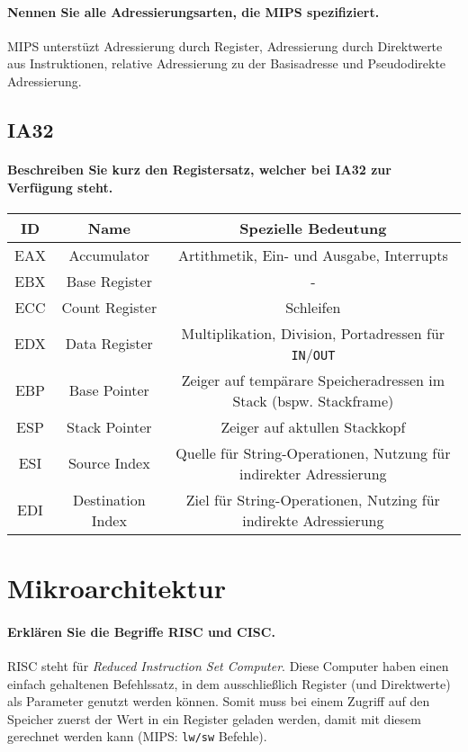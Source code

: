 \documentclass[a4paper, 11pt, accentcolor = tud3b]{tudreport}
\begin{document}
                \paragraph{Nennen Sie alle Adressierungsarten, die MIPS spezifiziert.}
                    MIPS unterstüzt Adressierung durch Register, Adressierung durch Direktwerte aus Instruktionen, relative Adressierung zu der Basisadresse und Pseudodirekte Adressierung.

            \subsection{IA32}
                \paragraph{Beschreiben Sie kurz den Registersatz, welcher bei IA32 zur Verfügung steht.}
                    \begin{tabular}{c | c | c}
                        ID & Name & Spezielle Bedeutung \\
                        \hline
                        EAX & Accumulator & Artithmetik, Ein- und Ausgabe, Interrupts \\
                        EBX & Base Register & - \\
                        ECC & Count Register & Schleifen \\
                        EDX & Data Register & Multiplikation, Division, Portadressen für \texttt{IN}/\texttt{OUT} \\
                        EBP & Base Pointer & Zeiger auf tempärare Speicheradressen im Stack (bspw. Stackframe) \\
                        ESP & Stack Pointer & Zeiger auf aktullen Stackkopf \\
                        ESI & Source Index & Quelle für String-Operationen, Nutzung für indirekter Adressierung \\
                        EDI & Destination Index & Ziel für String-Operationen, Nutzing für indirekte Adressierung \\
                    \end{tabular}

        \section{Mikroarchitektur}
            \paragraph{Erklären Sie die Begriffe RISC und CISC.}
                RISC steht für \textit{Reduced Instruction Set Computer}. Diese Computer haben einen einfach gehaltenen Befehlssatz, in dem ausschließlich Register (und Direktwerte) als Parameter genutzt werden können. Somit muss bei einem Zugriff auf den Speicher zuerst der Wert in ein Register geladen werden, damit mit diesem gerechnet werden kann (MIPS: \texttt{lw/sw} Befehle).
\end{document}
